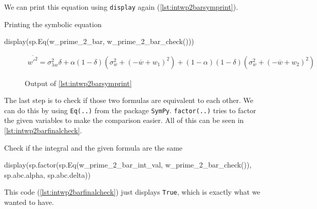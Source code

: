 We can print this equation using \texttt{display} again (\cref{lst:intwp2barsymprint}).
\begin{listing}[!ht]
    \caption{Printing the symbolic equation}
    \label{lst:intwp2barsymprint}
    \begin{pythoncode}
        display(sp.Eq(w_prime_2_bar, w_prime_2_bar_check()))
    \end{pythoncode}
\end{listing}
\begin{figure}[!ht]
    \centering
    \caption{Output of \cref{lst:intwp2barsymprint}}
    \label{fig:intwp2barsymprintout}
    \begin{align}
        \nonumber
        \overline{w'^2} = \sigma_{\lambda w}^{2} \delta + \alpha \left(1 - \delta\right) \left(\sigma_{w}^{2} + \left(- \overline{w} + w_{1}\right)^{2}\right) + \left(1 - \alpha\right) \left(1 - \delta\right) \left(\sigma_{w}^{2} + \left(- \overline{w} + w_{2}\right)^{2}\right)
    \end{align}
\end{figure}
The last step is to check if those two formulas are equivalent to each other.
We can do this by using \texttt{Eq(..)} from the package \texttt{SymPy}.
\texttt{factor(..)} tries to factor the given variables to make the comparison easier.
All of this can be seen in \cref{lst:intwp2barfinalcheck}.
\begin{listing}[!ht]
    \caption{Check if the integral and the given formula are the same}
    \label{lst:intwp2barfinalcheck}
    \begin{pythoncode}
        display(sp.factor(sp.Eq(w_prime_2_bar_int_val, w_prime_2_bar_check()),
            sp.abc.alpha, sp.abc.delta))
    \end{pythoncode}
\end{listing}
This code (\cref{lst:intwp2barfinalcheck}) just displays \texttt{True},
which is exactly what we wanted to have.